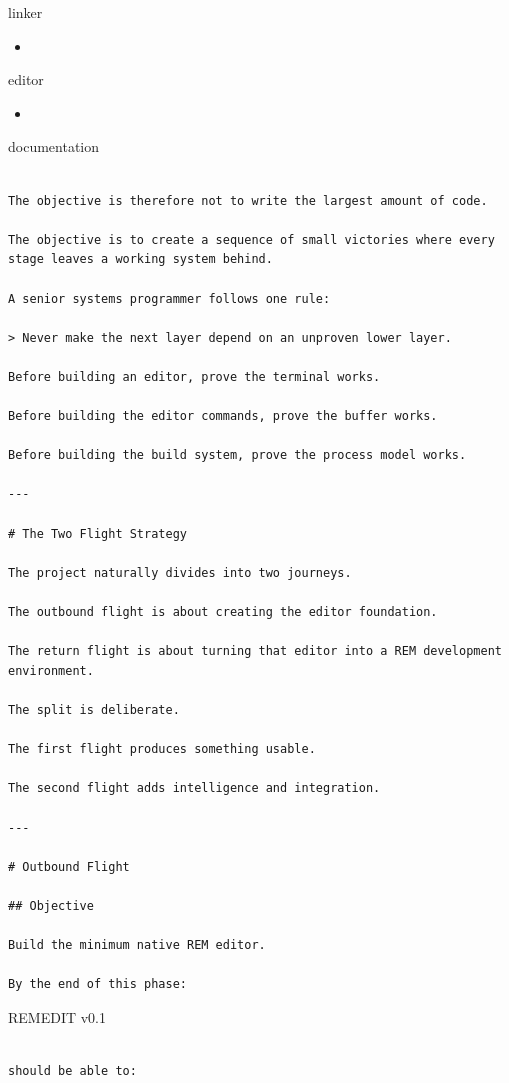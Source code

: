 \documentclass[
  oneside,
  openany]{book}
\providecommand{\tightlist}{%
  \setlength{\itemsep}{0pt}\setlength{\parskip}{0pt}}
\begin{document}
linker

\begin{itemize}
\tightlist
\item
\end{itemize}

editor

\begin{itemize}
\tightlist
\item
\end{itemize}

documentation

\begin{verbatim}

The objective is therefore not to write the largest amount of code.

The objective is to create a sequence of small victories where every stage leaves a working system behind.

A senior systems programmer follows one rule:

> Never make the next layer depend on an unproven lower layer.

Before building an editor, prove the terminal works.

Before building the editor commands, prove the buffer works.

Before building the build system, prove the process model works.

---

# The Two Flight Strategy

The project naturally divides into two journeys.

The outbound flight is about creating the editor foundation.

The return flight is about turning that editor into a REM development environment.

The split is deliberate.

The first flight produces something usable.

The second flight adds intelligence and integration.

---

# Outbound Flight

## Objective

Build the minimum native REM editor.

By the end of this phase:
\end{verbatim}

REMEDIT v0.1

\begin{verbatim}

should be able to:
\end{verbatim}
\end{document}
